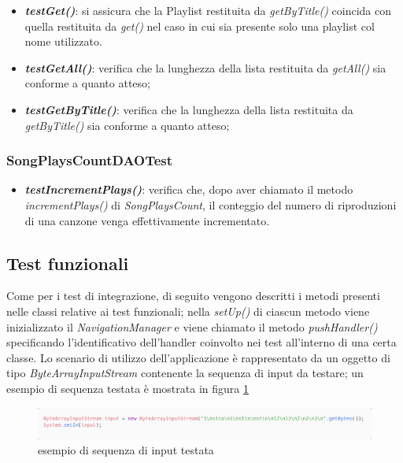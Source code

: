 \documentclass{article}
\begin{document}
  \begin{itemize}
    \item
    \textbf{\textit{testGet()}}: si assicura che la Playlist restituita da
    \textit{getByTitle()} coincida con quella restituita da  \textit{get()} nel caso
    in cui sia presente solo una playlist col nome utilizzato.

    \item
    \textbf{\textit{testGetAll()}}: verifica che la lunghezza della lista restituita da
    \textit{getAll()} sia conforme a quanto atteso;

    \item
    \textbf{\textit{testGetByTitle()}}: verifica che la lunghezza della lista restituita da
    \textit{getByTitle()} sia conforme a quanto atteso;

  \end{itemize}

  \subsubsection{SongPlaysCountDAOTest}
  \begin{itemize}
    \item
    \textbf{\textit{testIncrementPlays()}}: verifica che, dopo aver chiamato il metodo \textit{incrementPlays()} di \textit{SongPlaysCount}, il conteggio del numero di riproduzioni di una canzone venga effettivamente incrementato.
  \end{itemize}

  \subsection{Test funzionali}

  Come per i test di integrazione, di seguito vengono descritti i metodi presenti nelle classi relative ai test funzionali; nella \textit{setUp()} di ciascun metodo viene inizializzato il \textit{NavigationManager} e viene chiamato il metodo \textit{pushHandler()} specificando l'identificativo dell'handler coinvolto nei test all'interno di una certa classe. Lo scenario di utilizzo dell'applicazione è rappresentato da un oggetto di tipo \textit{ByteArrayInputStream} contenente la sequenza di input da testare; un esempio di sequenza testata è mostrata in figura \ref{fig:testString}

  \begin{figure}[H]
    \centering
    \includegraphics[width=1\linewidth]{testString.png}
    \caption{esempio di sequenza di input testata}
    \label{fig:testString}
  \end{figure}
\end{document}

